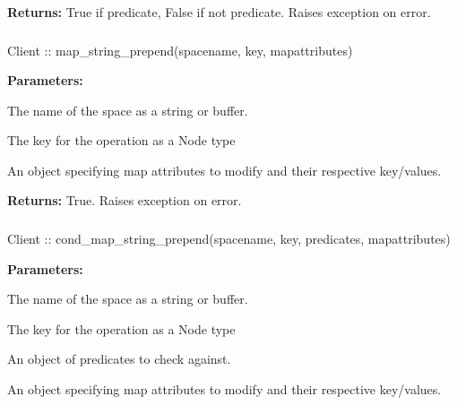\noindent\textbf{Returns:}
True if predicate, False if not predicate.  Raises exception on error.

\subsubsection{}
\label{api:nodejs:map_string_prepend}
\begin{javascriptcode}
Client :: map_string_prepend(spacename, key, mapattributes)
\end{javascriptcode}
\funcdesc 

\noindent\textbf{Parameters:}
\begin{description}[labelindent=\widthof{{\code{mapattributes}}},leftmargin=*,noitemsep,nolistsep,align=right]
\item[\code{spacename}] The name of the space as a string or buffer.
\item[\code{key}] The key for the operation as a Node type
\item[\code{mapattributes}] An object specifying map attributes to modify and their respective key/values.
\end{description}

\noindent\textbf{Returns:}
True.  Raises exception on error.

\subsubsection{}
\label{api:nodejs:cond_map_string_prepend}
\begin{javascriptcode}
Client :: cond_map_string_prepend(spacename, key, predicates, mapattributes)
\end{javascriptcode}
\funcdesc 

\noindent\textbf{Parameters:}
\begin{description}[labelindent=\widthof{{\code{mapattributes}}},leftmargin=*,noitemsep,nolistsep,align=right]
\item[\code{spacename}] The name of the space as a string or buffer.
\item[\code{key}] The key for the operation as a Node type
\item[\code{predicates}] An object of predicates to check against.
\item[\code{mapattributes}] An object specifying map attributes to modify and their respective key/values.
\end{description}

